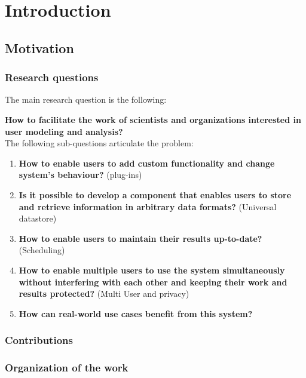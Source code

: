 
\chapter{\label{cha:intro}Introduction}

\section{Motivation}


\subsection{Research questions}

The main research question is the following:

\textbf{How to facilitate the work of scientists and organizations interested in user modeling and analysis?}\\

The following sub-questions articulate the problem:

\begin{enumerate}
\item \textbf{How to enable users to add custom functionality and change system's behaviour?} (plug-ins)

\item \textbf{Is it possible to develop a component that enables users to store and retrieve information in arbitrary data formats?} (Universal datastore)

\item \textbf{How to enable users to maintain their results up-to-date?}  (Scheduling)


\item \textbf{How to enable multiple users to use the system simultaneously without interfering with each other and keeping their work and results protected?} (Multi User and privacy)


\item \textbf{How can real-world use cases benefit from this system?}

\end{enumerate}

\subsection{Contributions}

\subsection{Organization of the work}

